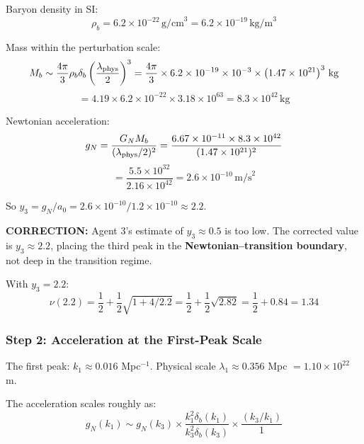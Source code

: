 \documentclass[11pt,a4paper]{article}
\begin{document}
Baryon density in SI:
\begin{equation}
\rho_b = 6.2\times10^{-22}\,\text{g/cm}^3 = 6.2\times10^{-19}\,\text{kg/m}^3
\end{equation}

Mass within the perturbation scale:
\begin{equation}
M_b \sim \frac{4\pi}{3}\rho_b\delta_b\left(\frac{\lambda_{\rm phys}}{2}\right)^3 = \frac{4\pi}{3} \times 6.2\times10^{-19} \times 10^{-3} \times \left(1.47\times10^{21}\right)^3\,\text{kg}
\end{equation}
\begin{equation}
= 4.19 \times 6.2\times10^{-22} \times 3.18\times10^{63} = 8.3\times10^{42}\,\text{kg}
\end{equation}

Newtonian acceleration:
\begin{equation}
g_N = \frac{G_N M_b}{(\lambda_{\rm phys}/2)^2} = \frac{6.67\times10^{-11} \times 8.3\times10^{42}}{(1.47\times10^{21})^2}
\end{equation}
\begin{equation}
= \frac{5.5\times10^{32}}{2.16\times10^{42}} = 2.6\times10^{-10}\,\text{m/s}^2
\end{equation}

So $y_3 = g_N/a_0 = 2.6\times10^{-10}/1.2\times10^{-10} \approx 2.2$.

\textbf{CORRECTION:} Agent 3's estimate of $y_3 \approx 0.5$ is too low. The corrected value is $y_3 \approx 2.2$, placing the third peak in the \textbf{Newtonian--transition boundary}, not deep in the transition regime.

With $y_3 = 2.2$:
\begin{equation}
\nu(2.2) = \frac{1}{2} + \frac{1}{2}\sqrt{1 + 4/2.2} = \frac{1}{2} + \frac{1}{2}\sqrt{2.82} = \frac{1}{2} + 0.84 = 1.34
\end{equation}

\subsubsection{Step 2: Acceleration at the First-Peak Scale}

The first peak: $k_1 \approx 0.016$ Mpc$^{-1}$. Physical scale $\lambda_1 \approx 0.356$ Mpc $= 1.10\times10^{22}$ m.

The acceleration scales roughly as:
\begin{equation}
g_N(k_1) \sim g_N(k_3) \times \frac{k_1^2\delta_b(k_1)}{k_3^2\delta_b(k_3)} \times \frac{(k_3/k_1)}{1}
\end{equation}
\end{document}
